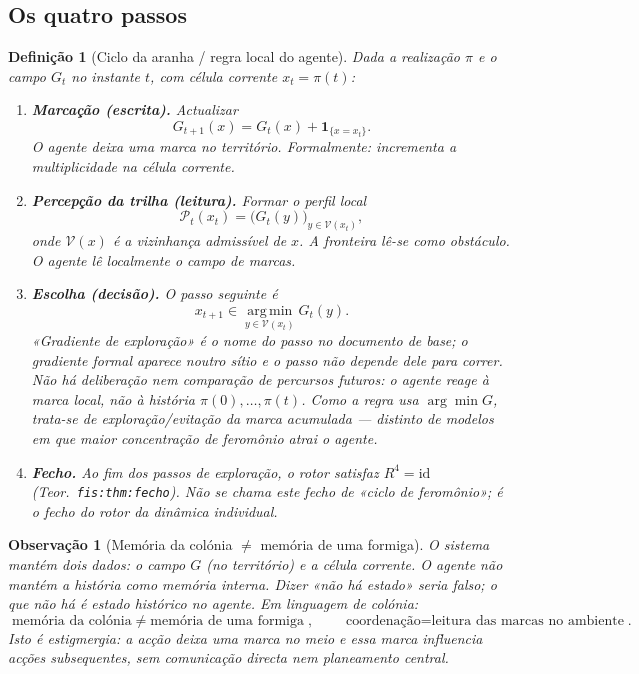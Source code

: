 \documentclass[11pt,a4paper]{article}
\newtheorem{definicao}{Definição}
\newtheorem{observacao}{Observação}
\begin{document}
\subsection{Os quatro passos}

\begin{definicao}[Ciclo da aranha / regra local do agente]
\label{def:ciclo-aranha}
Dada a realização \(\pi\) e o campo \(G_t\) no instante \(t\), com célula corrente \(x_t=\pi(t)\):
\begin{enumerate}[leftmargin=1.5em]
\item \textbf{Marcação (escrita).} Actualizar
\[
G_{t+1}(x)=G_t(x)+\mathbf 1_{\{x=x_t\}}.
\]
O agente deixa uma marca no território. Formalmente: incrementa a multiplicidade na célula corrente.
\item \textbf{Percepção da trilha (leitura).} Formar o perfil local
\[
\mathcal P_t(x_t)=\bigl(G_t(y)\bigr)_{y\in\mathcal V(x_t)},
\]
onde \(\mathcal V(x)\) é a vizinhança admissível de \(x\). A fronteira lê-se como obstáculo. O agente lê localmente o campo de marcas.
\item \textbf{Escolha (decisão).} O passo seguinte é
\[
x_{t+1}\in\operatorname*{arg\,min}_{y\in\mathcal V(x_t)}G_t(y).
\]
«Gradiente de exploração» é o nome do passo no documento de base; o gradiente formal aparece noutro sítio e o passo não depende dele para correr. Não há deliberação nem comparação de percursos futuros: o agente reage à marca local, não à história \(\pi(0),\dots,\pi(t)\). Como a regra usa \(\arg\min G\), trata-se de exploração/evitação da marca acumulada --- distinto de modelos em que maior concentração de feromônio atrai o agente.
\item \textbf{Fecho.} Ao fim dos passos de exploração, o rotor satisfaz \(R^4=\mathrm{id}\) (Teor.\ \texttt{fis:thm:fecho}). Não se chama este fecho de «ciclo de feromônio»; é o fecho do rotor da dinâmica individual.
\end{enumerate}
\end{definicao}

\begin{observacao}[Memória da colónia \(\neq\) memória de uma formiga]
\label{obs:memoria-espaco}
O \emph{sistema} mantém dois dados: o campo \(G\) (no território) e a célula corrente. O \emph{agente} não mantém a história como memória interna. Dizer «não há estado» seria falso; o que não há é estado histórico \emph{no agente}. Em linguagem de colónia:
\[
\boxed{\text{memória da colónia}\;\neq\;\text{memória de uma formiga}},
\qquad
\boxed{\text{coordenação}=\text{leitura das marcas no ambiente}}.
\]
Isto é estigmergia: a acção deixa uma marca no meio e essa marca influencia acções subsequentes, sem comunicação directa nem planeamento central.
\end{observacao}
\end{document}
